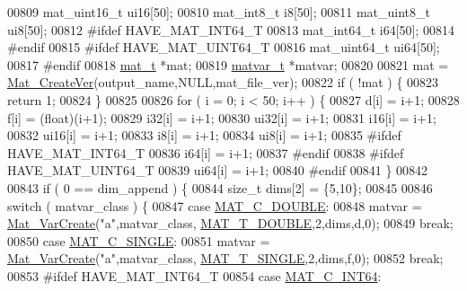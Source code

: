 \begin{DoxyCode}
{{{00809     mat\_uint16\_t ui16[50];
00810     mat\_int8\_t    i8[50];
00811     mat\_uint8\_t  ui8[50];
00812 \textcolor{preprocessor}{#ifdef HAVE\_MAT\_INT64\_T}
00813     mat\_int64\_t i64[50];
00814 \textcolor{preprocessor}{#endif}
00815 \textcolor{preprocessor}{#ifdef HAVE\_MAT\_UINT64\_T}
00816     mat\_uint64\_t ui64[50];
00817 \textcolor{preprocessor}{#endif}
00818     \hyperlink{struct__mat__t}{mat\_t} *mat;
00819     \hyperlink{group___m_a_t_structmatvar__t}{matvar\_t} *matvar;
00820 
00821     mat = \hyperlink{group___m_a_t_ga22d404f203af7869c841400e7ad247cf}{Mat\_CreateVer}(output\_name,NULL,mat\_file\_ver);
00822     \textcolor{keywordflow}{if} ( !mat ) \{
00823         \textcolor{keywordflow}{return} 1;
00824     \}
00825 
00826     \textcolor{keywordflow}{for} ( i = 0; i < 50; i++ ) \{
00827           d[i] = i+1;
00828           f[i] = (float)(i+1);
00829         i32[i] = i+1;
00830        ui32[i] = i+1;
00831         i16[i] = i+1;
00832        ui16[i] = i+1;
00833          i8[i] = i+1;
00834         ui8[i] = i+1;
00835 \textcolor{preprocessor}{#ifdef HAVE\_MAT\_INT64\_T}
00836         i64[i] = i+1;
00837 \textcolor{preprocessor}{#endif}
00838 \textcolor{preprocessor}{#ifdef HAVE\_MAT\_UINT64\_T}
00839         ui64[i] = i+1;
00840 \textcolor{preprocessor}{#endif}
00841     \}
00842 
00843     \textcolor{keywordflow}{if} ( 0 == dim\_append ) \{
00844         \textcolor{keywordtype}{size\_t} dims[2] = \{5,10\};
00845 
00846         \textcolor{keywordflow}{switch} ( matvar\_class ) \{
00847             \textcolor{keywordflow}{case} \hyperlink{group___m_a_t_ggad4d60ae7b709fc81bfd744fb4c857c40a5d70e0862e5bdb7bd86bf7ba5948f307}{MAT\_C\_DOUBLE}:
00848                 matvar = \hyperlink{group___m_a_t_ga1c54a84bb4d810c6fccdb8869489eac4}{Mat\_VarCreate}(\textcolor{stringliteral}{"a"},matvar\_class,
      \hyperlink{group___m_a_t_ggacf7b3b879282b7ab3a51190e49bf3453a31e721ecf7e188196f83c32838288797}{MAT\_T\_DOUBLE},2,dims,d,0);
00849                 \textcolor{keywordflow}{break};
00850             \textcolor{keywordflow}{case} \hyperlink{group___m_a_t_ggad4d60ae7b709fc81bfd744fb4c857c40a2825631e26a961cbe0f79db50a39cea2}{MAT\_C\_SINGLE}:
00851                 matvar = \hyperlink{group___m_a_t_ga1c54a84bb4d810c6fccdb8869489eac4}{Mat\_VarCreate}(\textcolor{stringliteral}{"a"},matvar\_class,
      \hyperlink{group___m_a_t_ggacf7b3b879282b7ab3a51190e49bf3453a3a3657d40e9212c923d9b9d03531b64c}{MAT\_T\_SINGLE},2,dims,f,0);
00852                 \textcolor{keywordflow}{break};
00853 \textcolor{preprocessor}{#ifdef HAVE\_MAT\_INT64\_T}
00854             \textcolor{keywordflow}{case} \hyperlink{group___m_a_t_ggad4d60ae7b709fc81bfd744fb4c857c40a1ea83bcde49b35477494412973f82409}{MAT\_C\_INT64}:
}}}
\end{DoxyCode}
